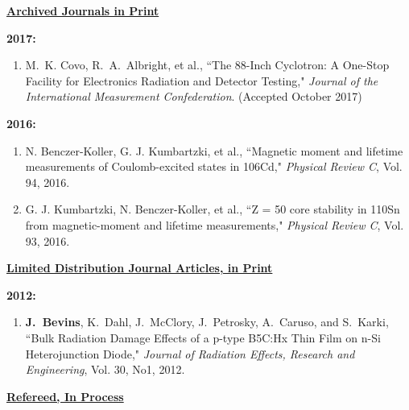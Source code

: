 \underline{\textbf{Archived Journals in Print}}

\textbf{2017:}
\begin{enumerate}
\item M.\ K. Covo, R.\ A.\ Albright, et al., ``The 88-Inch Cyclotron: A One-Stop Facility for Electronics Radiation and Detector Testing," \textit{Journal of the International Measurement Confederation}. (Accepted October 2017)
\end{enumerate}

\textbf{2016:}
\begin{enumerate}
  \item N. Benczer-Koller, G. J. Kumbartzki, et al., ``Magnetic moment and lifetime measurements of Coulomb-excited states in 106Cd," \textit{Physical Review C}, Vol. 94, 2016.
  
  \item G. J. Kumbartzki, N. Benczer-Koller, et al., ``Z = 50 core stability in 110Sn from magnetic-moment and lifetime measurements," \textit{Physical Review C}, Vol. 93, 2016.
\end{enumerate}


\underline{\textbf{Limited Distribution Journal Articles, in Print }}

\textbf{2012:}
\begin{enumerate}
  \item \textbf{J.\ Bevins}, K.\ Dahl, J.\ McClory, J.\ Petrosky, A.\ Caruso, and S.\ Karki, ``Bulk Radiation Damage Effects of a p-type B5C:Hx Thin Film on n-Si Heterojunction Diode," \textit{Journal of Radiation Effects, Research and Engineering}, Vol. 30, No1, 2012.
\end{enumerate}


\underline{\textbf{Refereed, In Process}}

